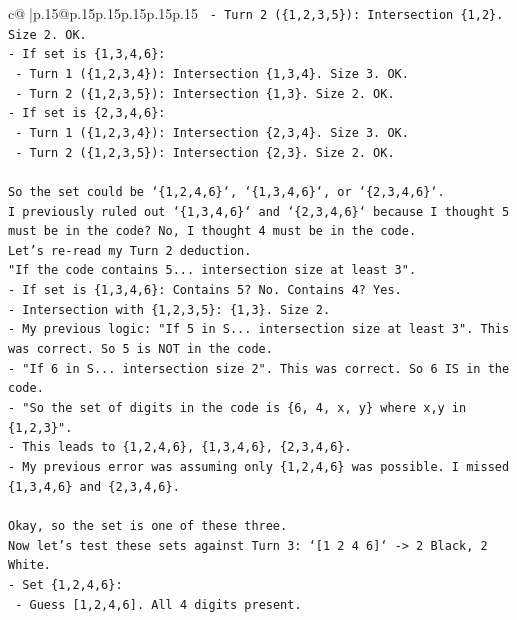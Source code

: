\documentclass{article}
\begin{document}
{\begin{supertabular}{c@{$\;$}|p{.15\linewidth}@{}p{.15\linewidth}p{.15\linewidth}p{.15\linewidth}p{.15\linewidth}p{.15\linewidth}}
{{{\texttt{  {-} Turn 2 (\{1,2,3,5\}): Intersection \{1,2\}. Size 2. OK.} \\
\texttt{{-} If set is \{1,3,4,6\}:} \\
\texttt{  {-} Turn 1 (\{1,2,3,4\}): Intersection \{1,3,4\}. Size 3. OK.} \\
\texttt{  {-} Turn 2 (\{1,2,3,5\}): Intersection \{1,3\}. Size 2. OK.} \\
\texttt{{-} If set is \{2,3,4,6\}:} \\
\texttt{  {-} Turn 1 (\{1,2,3,4\}): Intersection \{2,3,4\}. Size 3. OK.} \\
\texttt{  {-} Turn 2 (\{1,2,3,5\}): Intersection \{2,3\}. Size 2. OK.} \\
\\ 
\texttt{So the set could be `\{1,2,4,6\}`, `\{1,3,4,6\}`, or `\{2,3,4,6\}`.} \\
\texttt{I previously ruled out `\{1,3,4,6\}` and `\{2,3,4,6\}` because I thought 5 must be in the code? No, I thought 4 must be in the code.} \\
\texttt{Let's re{-}read my Turn 2 deduction.} \\
\texttt{"If the code contains 5... intersection size at least 3".} \\
\texttt{{-} If set is \{1,3,4,6\}: Contains 5? No. Contains 4? Yes.} \\
\texttt{{-} Intersection with \{1,2,3,5\}: \{1,3\}. Size 2.} \\
\texttt{{-} My previous logic: "If 5 in S... intersection size at least 3". This was correct. So 5 is NOT in the code.} \\
\texttt{{-} "If 6 in S... intersection size 2". This was correct. So 6 IS in the code.} \\
\texttt{{-} "So the set of digits in the code is \{6, 4, x, y\} where x,y in \{1,2,3\}".} \\
\texttt{{-} This leads to \{1,2,4,6\}, \{1,3,4,6\}, \{2,3,4,6\}.} \\
\texttt{{-} My previous error was assuming only \{1,2,4,6\} was possible. I missed \{1,3,4,6\} and \{2,3,4,6\}.} \\
\\ 
\texttt{Okay, so the set is one of these three.} \\
\texttt{Now let's test these sets against Turn 3: `{[}1 2 4 6{]}` {-}> 2 Black, 2 White.} \\
\texttt{{-} Set \{1,2,4,6\}:} \\
\texttt{  {-} Guess {[}1,2,4,6{]}. All 4 digits present.} \\
}}}
\end{supertabular}}
\end{document}
